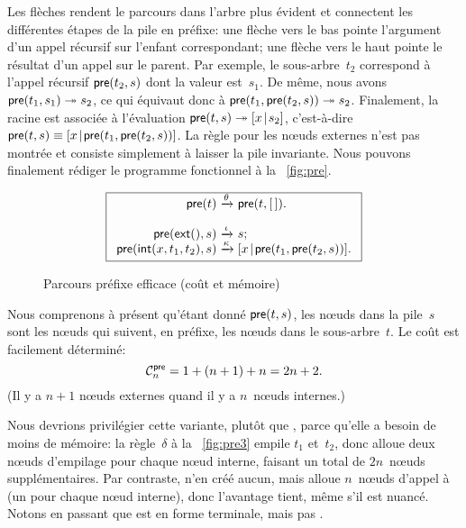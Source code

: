 Les flèches rendent le parcours dans l'arbre plus évident et
connectent les différentes étapes de la pile en préfixe: une flèche
vers le bas pointe l'argument d'un appel récursif sur l'enfant
correspondant; une flèche vers le haut pointe le résultat d'un appel
sur le parent. Par exemple, le sous-arbre~\(t_2\) correspond à l'appel
récursif \(\textsf{pre}(t_2,s)\) dont la valeur
est~\(s_1\).  De même, nous avons \(\textsf{pre}(t_1,s_1)
\twoheadrightarrow s_2\), ce qui équivaut donc à
\(\textsf{pre}(t_1,\textsf{pre}(t_2,s)) \twoheadrightarrow
s_2\). Finalement, la racine est associée à l'évaluation
\(\textsf{pre}(t,s) \twoheadrightarrow [{x}\!\mid\!{s_2}]\), c'est-à-dire
\(\textsf{pre}(t,s) \equiv
[{x}\!\mid\!{\textsf{pre}(t_1,\textsf{pre}(t_2,s))}]\). La
règle pour les nœuds externes n'est pas montrée et consiste
simplement à laisser la pile invariante. Nous pouvons finalement
rédiger le programme fonctionnel à la \fig~\vref{fig:pre}.
\begin{figure}[b]
\begin{equation*}
\boxed{
\begin{array}{r@{\;}c@{\;}l}
\fun{pre}(t) & \xrightarrow{\smash{\theta}} & \fun{pre}(t,\el).\\
\\
\fun{pre}(\fun{ext}(),s) & \xrightarrow{\smash{\iota}} & s;\\
\fun{pre}(\fun{int}(x,t_1,t_2),s)
  & \xrightarrow{\smash{\kappa}}
  & \cons{x}{\fun{pre}(t_1,\fun{pre}(t_2,s))}.
\end{array}}
\end{equation*}
\caption{Parcours préfixe efficace (coût et mémoire)}
\label{fig:pre}
\end{figure}
Nous comprenons à présent qu'étant donné \(\textsf{pre}(t,s)\), les
nœuds dans la pile~\(s\) sont les nœuds qui suivent, en
préfixe, les nœuds dans le sous-arbre~\(t\). Le coût est
facilement déterminé:
\begin{equation}
\C{\fun{pre}}{n} = 1 + (n+1) + n = 2n+2.\label{eq:pre}
\index{pre@$\C{\fun{pre}}{n}$}
\end{equation}
(Il y a \(n+1\) nœuds externes quand il y a \(n\)~nœuds
internes.)

Nous devrions privilégier cette variante, plutôt que
, parce qu'elle a
besoin de moins de mémoire: la règle~\(\delta\) à la
\fig~\vref{fig:pre3} empile \(t_1\) et~\(t_2\), donc alloue deux
nœuds d'empilage pour chaque nœud
interne, faisant un total de \(2n\)~nœuds supplémentaires. Par
contraste,  n'en créé aucun, mais
alloue \(n\)~nœuds d'appel à 
(un pour chaque nœud interne), donc l'avantage tient, même s'il
est nuancé. Notons en passant que
 est en forme
terminale, mais pas
.

